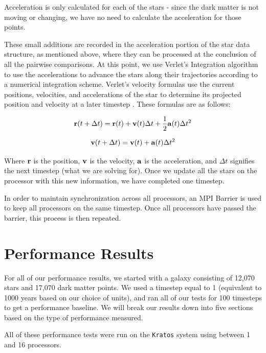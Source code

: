 \documentclass{article}
\begin{document}
Acceleration is only calculated for each of the stars - since the dark matter is not moving or changing, we have no need to calculate the acceleration for those points.

These small additions are recorded in the acceleration portion of the star data structure, as mentioned above, where they can be processed at the conclusion of all the pairwise comparisons.  At this point, we use Verlet's Integration algorithm to use the accelerations to advance the stars along their trajectories according to a numerical integration scheme. Verlet's velocity formulas use the current positions, velocities, and accelerations of the star to determine its projected position and velocity at a later timestep \cite{verlet}.  These  formulas are as follows:
          
\begin{equation}
{\bf r}(t + \Delta t) = {\bf r}(t) + {\bf v}(t) \Delta t + \frac{1}{2} {\bf a}(t) \Delta t^{2}
\end{equation}         

\begin{equation}
{\bf v}(t + \Delta t) = {\bf v}(t) + {\bf a}(t) \Delta t^{2}
\end{equation}                                                                         

Where ${\bf r}$ is the position, ${\bf v}$ is the velocity, ${\bf a}$ is the acceleration, and $\Delta t$ signifies the next timestep (what we are solving for).  Once we update all the stars on the processor with this new information, we have completed one timestep.  

In order to maintain synchronization across all processors, an MPI Barrier is used to keep all processors on the same timestep.  Once all processors have passed the barrier, this process is then repeated. 

\section{Performance Results}

For all of our performance results, we started with a galaxy consisting of 12,070 stars and 17,070 dark matter points.  We used a timestep equal to 1 (equivalent to 1000 years based on our choice of units), and ran all of our tests for 100 timesteps to get a performance baseline.  We will break our results down into five sections based on the type of performance measured.

All of these performance tests were run on the \texttt{Kratos} system using between 1 and 16 processors.  
\end{document}
